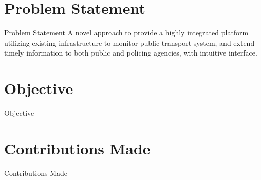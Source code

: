 \documentclass{beamer}
\begin{document}



\section{Problem Statement}
\begin{frame}{Problem Statement}
	A novel approach to provide a highly integrated platform utilizing existing infrastructure to monitor public transport system, and extend timely information to both public and policing agencies, with intuitive interface.
\end{frame}


\section{Objective}
\begin{frame}{Objective}
\end{frame}


\section{Contributions Made}
\begin{frame}{Contributions Made}
\end{frame}
\end{document}
